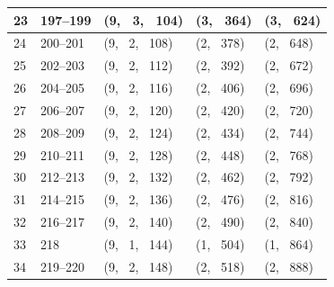 \documentclass[report.tex]{subfiles}
\begin{document}
\begin{table}[ht]
\begin{tabular}{ |l|l|l|l|l| }
\hline
23 & 197--199 & (9, \ 3, \ 104) & (3, \ 364) & (3, \ 624) \\
\hline
24 & 200--201 & (9, \ 2, \ 108) & (2, \ 378) & (2, \ 648) \\
\hline
25 & 202--203 & (9, \ 2, \ 112) & (2, \ 392) & (2, \ 672) \\
\hline
26 & 204--205 & (9, \ 2, \ 116) & (2, \ 406) & (2, \ 696) \\
\hline
27 & 206--207 & (9, \ 2, \ 120) & (2, \ 420) & (2, \ 720) \\
\hline
28 & 208--209 & (9, \ 2, \ 124) & (2, \ 434) & (2, \ 744) \\
\hline
29 & 210--211 & (9, \ 2, \ 128) & (2, \ 448) & (2, \ 768) \\
\hline
30 & 212--213 & (9, \ 2, \ 132) & (2, \ 462) & (2, \ 792) \\
\hline
31 & 214--215 & (9, \ 2, \ 136) & (2, \ 476) & (2, \ 816) \\
\hline
32 & 216--217 & (9, \ 2, \ 140) & (2, \ 490) & (2, \ 840) \\
\hline
33 & 218 & (9, \ 1, \ 144) & (1, \ 504) & (1, \ 864) \\
\hline
34 & 219--220 & (9, \ 2, \ 148) & (2, \ 518) & (2, \ 888) \\
\hline
\end{tabular}
\end{table}
\end{document}
